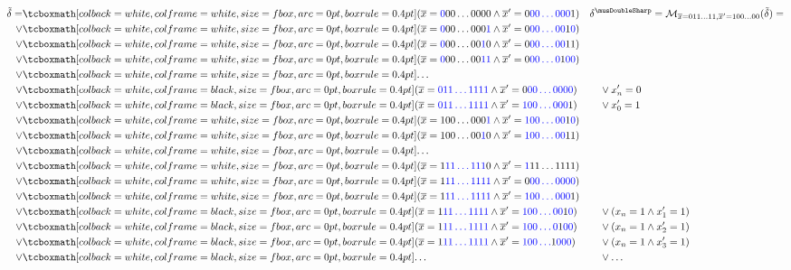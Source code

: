 \documentclass[acmsmall,screen]{acmart}
\newcommand{\ov}{\overline}
\newcommand{\tr}{\delta}
\renewcommand{\vec}{\ov}
\newcommand{\monox}[2]{\mathcal{M}_{#2}({#1})}
\newcommand{\absr}[1]{{#1}^{\musDoubleSharp}}
\newcommand{\litabs}[1]{\textcolor{blue}{#1}}
\begin{document}
\begin{align}
	\tilde{\tr}
		=
		  \label{eq:it:00start}
		  &\nbox{(\vec{x}=\litabs{0}00\ldots0000 \land \vec{x}'=0\litabs{00\ldots000}1)}
		  && \absr{\tr} = \monox{\tilde{\tr}}{\vec{x}=011\ldots11,\vec{x}'=100\ldots00} =
		\\
		\lor
		  &\nbox{(\vec{x}=\litabs{0}00\ldots000\litabs{1} \land \vec{x}'=0\litabs{00\ldots00}1\litabs{0})}
		  &&
	    \\
	    \lor
		  &
		  \nbox{(\vec{x}=\litabs{0}00\ldots00\litabs{1}0 \land \vec{x}'=0\litabs{00\ldots00}11)}
		  &&
	    \\
		\lor
		  &\nbox{(\vec{x}=\litabs{0}00\ldots00\litabs{11} \land \vec{x}'=0\litabs{00\ldots0}1\litabs{00})}
		  &&
	    \\
	    \label{eq:it:00end}
	    \lor
		  &
		  \nbox{\ldots}
		  &&
		\\
		\label{eq:it:0bounce}
		\lor
		  &\bbox{(\vec{x}=\litabs{011\ldots1111} \land \vec{x}'=0\litabs{00\ldots0000})}
		  && \quad \lor x'_n=0
		\\
		\label{eq:it:01skip}
		\lor
		  &\bbox{(\vec{x}=\litabs{011\ldots1111} \land \vec{x}'=\litabs{100\ldots000}1)}
		  && \quad \lor x'_0=1
		\\
		\lor
		\label{eq:it:11start}
		  &\nbox{(\vec{x}=100\ldots000\litabs{1} \land \vec{x}'=\litabs{100\ldots00}1\litabs{0})}
		  &&
		\\
		\lor
		  &\nbox{(\vec{x}=100\ldots00\litabs{1}0 \land \vec{x}'=\litabs{100\ldots00}11)}
		  &&
		\\
		\lor
		  &
		  \nbox{\ldots}
		  &&
		\\
		\lor
		\label{eq:it:11end}
		  &\nbox{(\vec{x}=1\litabs{11\ldots111}0 \land \vec{x}'=\litabs{1}11\ldots1111)}
		  &&
		\\
		\lor
		\label{eq:it:10wrap}
		  &
		  \nbox{(\vec{x}=1\litabs{11\ldots1111} \land \vec{x}'=0\litabs{00\ldots0000})}
		  &&
		\\
		\label{eq:it:1bounce-start}
		\lor
		  &\nbox{(\vec{x}=1\litabs{11\ldots1111} \land \vec{x}'=\litabs{100\ldots000}1)}
		  && 
		\\
		\label{eq:it:1bounce-start-really}
		\lor
		  &\bbox{(\vec{x}=1\litabs{11\ldots1111} \land \vec{x}'=\litabs{100\ldots00}1\litabs{0})}
		  && \quad \lor (x_n = 1 \land x'_1 = 1)
		\\
		\lor
		  &\bbox{(\vec{x}=1\litabs{11\ldots1111} \land \vec{x}'=\litabs{100\ldots0}1\litabs{00})}
		  && \quad \lor (x_n = 1 \land x'_2 = 1)
		\\
		\lor
		  &\bbox{(\vec{x}=1\litabs{11\ldots1111} \land \vec{x}'=\litabs{100\ldots}1\litabs{000})}
		  && \quad \lor (x_n = 1 \land x'_3 = 1)
		\\
		\lor
		  \label{eq:it:1bounce-end}
		  &\bbox{\ldots}
		  && \quad \lor \ldots
\end{align}
\end{document}
